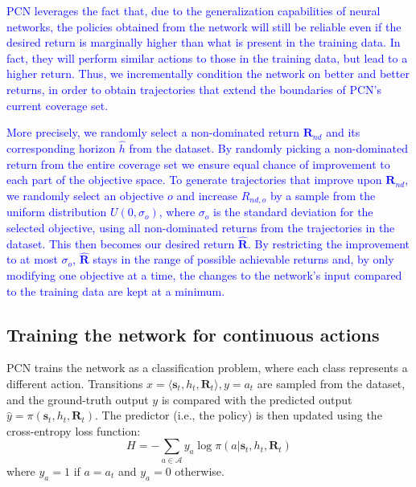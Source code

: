 \documentclass{article}
\newcommand\added[1]{\textcolor{blue}{#1}}
\newcommand{\mdpstate}{\mathbf{s}}
\newcommand{\momdpreturn}{\mathbf{R}}
\newcommand{\action}{a}
\begin{document}
\added{PCN leverages the fact that, due to the generalization capabilities of neural networks, the policies obtained from the network will still be reliable even if the desired return is marginally higher than what is present in the training data. In fact, they will perform similar actions to those in the training data, but lead to a higher return. Thus, we incrementally condition the network on better and better returns, in order to obtain trajectories that extend the boundaries of PCN's current coverage set.}

\added{More precisely, we randomly select a non-dominated return $\mathbf{R}_{nd}$ and its corresponding horizon $\hat{h}$ from the dataset. By randomly picking a non-dominated return from the entire coverage set we ensure equal chance of improvement to each part of the objective space. To generate trajectories that improve upon $\mathbf{R}_{nd}$, we randomly select an objective $o$ and increase $R_{nd,o}$ by a sample from the uniform distribution $U(0, \sigma_o)$, where $\sigma_o$ is the standard deviation for the selected objective, using all non-dominated returns from the trajectories in the dataset. This then becomes our desired return $\bm{\hat{R}}$. By restricting the improvement to at most $\sigma_o$, $\mathbf{\hat{R}}$ stays in the range of possible achievable returns and, by only modifying one objective at a time, the changes to the network's input compared to the training data are kept at a minimum.}

\subsection{Training the network for continuous actions}
\label{sec:pcn-continuous}

PCN trains the network as a classification problem, where each class represents a different action. Transitions $x= \langle \mdpstate_t, h_t, \momdpreturn_t \rangle, y=\action_t$ are sampled from the dataset, and the ground-truth output $y$ is compared with the predicted output $\hat{y}=\pi(\mdpstate_t, h_t, \momdpreturn_t)$. The predictor (i.e., the policy) is then updated using the cross-entropy loss function:
\begin{equation}
    H = -\sum_{\action \in \mathcal{A}}{y_{\action} \log \pi(\action|\mdpstate_t,h_t,\momdpreturn_t)}
\end{equation}
where $y_\action = 1$ if $\action = \action_t$ and $y_\action = 0$ otherwise.
\end{document}

